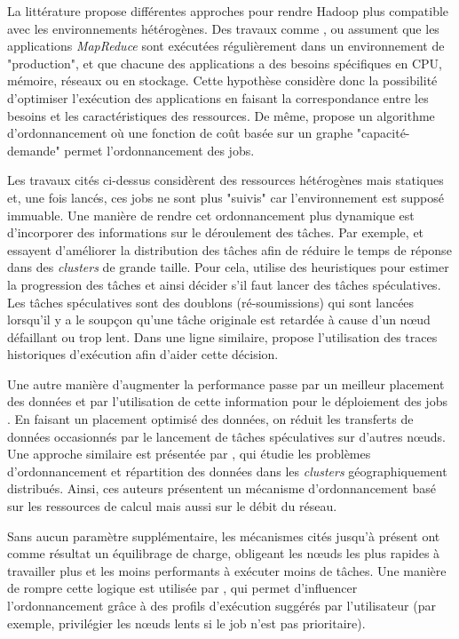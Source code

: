 La littérature propose différentes approches pour rendre Hadoop plus compatible avec les environnements hétérogènes. Des travaux comme \cite{Kumar2012}, \cite{Tian2009} ou \cite{Rasooli2012} assument que les applications \textit{MapReduce} sont exécutées régulièrement dans un environnement de "production", et que chacune des applications a des besoins spécifiques en CPU, mémoire, réseaux ou en stockage. Cette hypothèse considère donc la possibilité d'optimiser l'exécution des applications en faisant la correspondance entre les besoins et les caractéristiques des ressources. De même, \cite{Isard2009} propose un algorithme d'ordonnancement où une fonction de coût basée sur un graphe "capacité-demande" permet l'ordonnancement des jobs.

Les travaux cités ci-dessus considèrent des ressources hétérogènes mais statiques et, une fois lancés, ces jobs ne sont plus "suivis" car l'environnement est supposé immuable. Une manière de rendre cet ordonnancement plus dynamique est d'incorporer des informations sur le déroulement des tâches. Par exemple, \cite{Zaharia2008} et \cite{Chen} essayent d'améliorer la distribution des tâches afin de réduire le temps de réponse dans des \textit{clusters} de grande taille. Pour cela, \cite{Zaharia2008} utilise des heuristiques pour estimer la progression des tâches et ainsi décider s'il faut lancer des tâches spéculatives. Les tâches spéculatives sont des doublons (ré-soumissions) qui sont lancées lorsqu'il y a le soupçon qu'une tâche originale est retardée à cause d'un n{\oe}ud défaillant ou trop lent. Dans une ligne similaire, \cite{Chen} propose l'utilisation des traces historiques d'exécution afin d'aider cette décision. 

Une autre manière d'augmenter la performance passe par un meilleur placement des données et par l'utilisation de cette information pour le déploiement des jobs \cite{Xie2010}. En faisant un placement optimisé des données, on réduit les transferts de données occasionnés par le lancement de tâches spéculatives sur d'autres n{\oe}uds. Une approche similaire est présentée par \cite{Cavallo2015}, qui étudie les problèmes d'ordonnancement et répartition des données dans les \textit{clusters} géographiquement distribués. Ainsi, ces auteurs présentent un mécanisme d'ordonnancement basé sur les ressources de calcul mais aussi sur le débit du réseau.  

Sans aucun paramètre supplémentaire, les mécanismes cités jusqu'à présent ont comme résultat un équilibrage de charge, obligeant les n{\oe}uds les plus rapides à travailler plus et les moins performants à exécuter moins de tâches. Une manière de rompre cette logique est utilisée par \cite{Sandholm2010},  qui permet d'influencer l'ordonnancement grâce à des profils d'exécution suggérés par l'utilisateur (par exemple, privilégier les n{\oe}uds lents si le job n'est pas prioritaire).  


